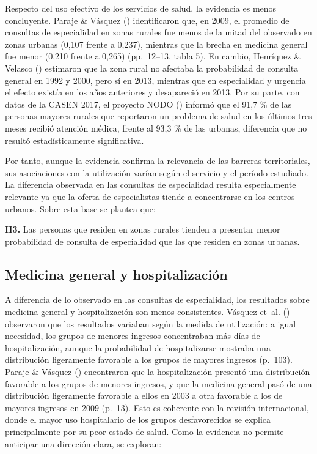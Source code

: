 \documentclass[
  spanish,
  a4paper,
  oneside]{scrbook}
\begin{document}
Respecto del uso efectivo de los servicios de salud, la evidencia es
menos concluyente. Paraje \& Vásquez
() identificaron que, en 2009, el
promedio de consultas de especialidad en zonas rurales fue menos de la
mitad del observado en zonas urbanas (0,107 frente a 0,237), mientras
que la brecha en medicina general fue menor (0,210 frente a 0,265)
(pp.~12--13, tabla 5). En cambio, Henríquez \& Velasco
() estimaron que la
zona rural no afectaba la probabilidad de consulta general en 1992 y
2000, pero sí en 2013, mientras que en especialidad y urgencia el efecto
existía en los años anteriores y desapareció en 2013. Por su parte, con
datos de la CASEN 2017, el proyecto NODO
() informó que el 91,7 \% de
las personas mayores rurales que reportaron un problema de salud en los
últimos tres meses recibió atención médica, frente al 93,3 \% de las
urbanas, diferencia que no resultó estadísticamente significativa.

Por tanto, aunque la evidencia confirma la relevancia de las barreras
territoriales, sus asociaciones con la utilización varían según el
servicio y el período estudiado. La diferencia observada en las
consultas de especialidad resulta especialmente relevante ya que la
oferta de especialistas tiende a concentrarse en los centros urbanos.
Sobre esta base se plantea que:

\textbf{H3.} Las personas que residen en zonas rurales tienden a
presentar menor probabilidad de consulta de especialidad que las que
residen en zonas urbanas.

\subsection{Medicina general y
hospitalización}\label{medicina-general-y-hospitalizaciuxf3n}

A diferencia de lo observado en las consultas de especialidad, los
resultados sobre medicina general y hospitalización son menos
consistentes. Vásquez et~al.
() observaron que los
resultados variaban según la medida de utilización: a igual necesidad,
los grupos de menores ingresos concentraban más días de hospitalización,
aunque la probabilidad de hospitalizarse mostraba una distribución
ligeramente favorable a los grupos de mayores ingresos (p.~103). Paraje
\& Vásquez () encontraron que la
hospitalización presentó una distribución favorable a los grupos de
menores ingresos, y que la medicina general pasó de una distribución
ligeramente favorable a ellos en 2003 a otra favorable a los de mayores
ingresos en 2009 (p.~13). Esto es coherente con la revisión
internacional, donde el mayor uso hospitalario de los grupos
desfavorecidos se explica principalmente por su peor estado de salud.
Como la evidencia no permite anticipar una dirección clara, se exploran:
\end{document}
